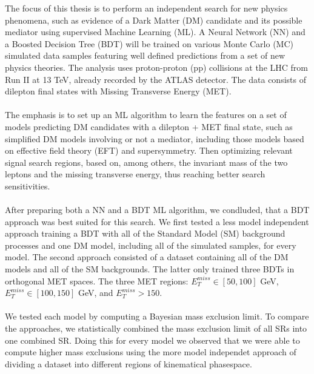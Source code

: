 \documentclass[12pt, a4paper]{book}
\begin{document}
The focus of this thesis is to perform an independent search for new physics phenomena, such as evidence of a Dark Matter (DM) candidate and its possible mediator using supervised Machine Learning (ML). A Neural Network (NN) and a Boosted Decision Tree (BDT) will 
be trained on various Monte Carlo (MC) simulated data samples featuring well defined predictions from a set of new physics theories. The analysis uses proton-proton (pp) collisions at the LHC from Run II at 13 TeV, already recorded by the ATLAS detector. 
The data consists of dilepton final states with Missing Transverse Energy (MET).\\
\\The emphasis is to set up an ML algorithm to learn the features on a set of models predicting DM candidates with a dilepton + MET final state, such as simplified DM models 
involving or not a mediator, including those models based on effective field theory (EFT) and supersymmetry. Then optimizing relevant signal search regions, based on, among others, the invariant mass of the two leptons and the missing transverse energy, 
thus reaching better search sensitivities.\\
\\After preparing both a NN and a BDT ML algorithm, we condluded, that a BDT approach was best suited for this search. We first tested a less model independent approach training a BDT with all of the Standard Model (SM) background processes and one DM model, 
including all of the simulated samples, for every model. The second approach consisted of a dataset containing all of the DM models and all of the SM backgrounds. The latter only trained three BDTs in orthogonal MET spaces. The three MET regions: $E_T^{miss}\in[50,100]$ GeV,
$E_T^{miss}\in[100,150]$ GeV, and $E_T^{miss}>150$.\\
\\We tested each model by computing a Bayesian mass exclusion limit. To compare the approaches, we statistically combined the mass exclusion limit of all SRs into one combined SR. Doing this for every model we observed that we were able 
to compute higher mass exclusions using the more model independet approach of dividing a dataset into different regions of kinematical phasespace. 
\end{document}
